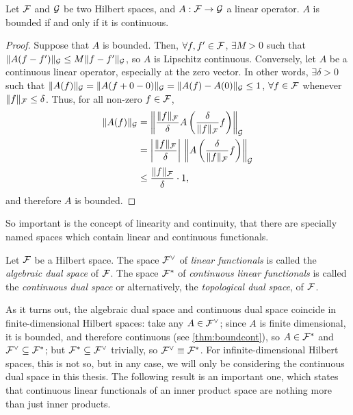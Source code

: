 \begin{lemma}\label{thm:boundcont}
  Let ${\mathcal F}$ and ${\mathcal G}$ be two Hilbert spaces, and $A:{\mathcal F}\to{\mathcal G}$ a linear operator.
  $A$ is bounded if and only if it is continuous.
\end{lemma}

\begin{proof}
  Suppose that $A$ is bounded.
  Then, $\forall f,f' \in {\mathcal F}$, $\exists M>0$ such that $\lVert A(f-f')\rVert_{\mathcal G} \leq M \lVert f-f'\rVert_{\mathcal G}$, so $A$ is Lipschitz continuous.
  Conversely, let $A$ be a continuous linear operator, especially at the zero vector.
  In other words, $\exists \delta > 0$ such that $\lVert A(f)\rVert_{\mathcal G} = \lVert A(f+0-0)\rVert_{\mathcal G} = \lVert A(f) - A(0)\rVert_{\mathcal G} \leq 1$, $\forall f\in{\mathcal F}$ whenever $\lVert f\rVert_{\mathcal F} \leq \delta$.
  Thus, for all non-zero $f \in{\mathcal F}$,
  \begingroup
  \setlength{\abovedisplayskip}{7pt}
  \setlength{\belowdisplayskip}{7pt}
  \begin{align*}
    \lVert A(f)\rVert_{\mathcal G} &= \left\Vert \frac{\lVert f\rVert_{\mathcal F}}{\delta} A\left(\frac{\delta}{\lVert f\rVert_{\mathcal F}}f\right)\right\Vert_{\mathcal G} \\
    &= \left\vert \frac{\lVert f\rVert_{\mathcal F}}{\delta}\right\vert \, \left\Vert A\left(\frac{\delta}{\lVert f\rVert_{\mathcal F}}f\right)\right\Vert_{\mathcal G} \\    
    &\leq \frac{\lVert f\rVert_{\mathcal F}}{\delta} \cdot 1,
  \end{align*}
  \endgroup
  and therefore $A$ is bounded.
\end{proof}
\vspace{-0.5em}
So important is the concept of linearity and continuity, that there are specially named spaces which contain linear and continuous functionals.

\begin{definition}
  Let ${\mathcal F}$ be a Hilbert space. 
  The space ${\mathcal F}^\vee$ of \emph{linear functionals} is called the \emph{algebraic dual space} of ${\mathcal F}$.
  The space ${\mathcal F}^*$ of \emph{continuous linear functionals} is called the \emph{continuous dual space} or alternatively, the \emph{topological dual space}, of ${\mathcal F}$.   
\end{definition}

As it turns out, the algebraic dual space and continuous dual space coincide in finite-dimensional Hilbert spaces:
take any $A\in{\mathcal F}^\vee$; since $A$ is finite dimensional, it is bounded, and therefore continuous (see \cref{thm:boundcont}), so $A\in{\mathcal F}^*$ and ${\mathcal F}^\vee \subseteq {\mathcal F}^*$; but ${\mathcal F}^* \subseteq {\mathcal F}^\vee$ trivially, so ${\mathcal F}^\vee \equiv {\mathcal F}^*$.
For infinite-dimensional Hilbert spaces, this is not so, but in any case, we will only be considering the continuous dual space in this thesis.
The following result is an important one, which states that continuous linear functionals of an inner product space are nothing more than just inner products.

